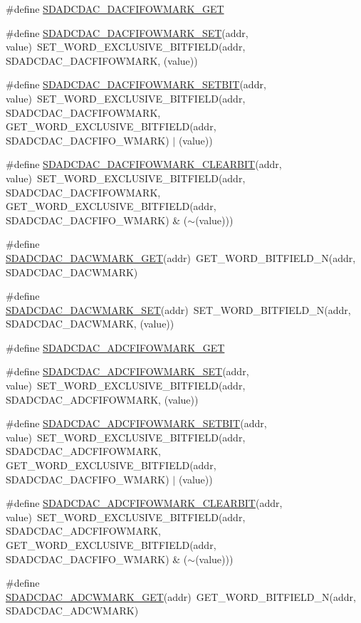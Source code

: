 \begin{DoxyCompactItemize}
\item 
\#define \hyperlink{a00568_a05842ec341ab68cd36ea521476d2c67e}{SDADCDAC\_\-DACFIFOWMARK\_\-GET}
\item 
\#define \hyperlink{a00568_a7d644ce92dcc20a0dbc3794cfcd77732}{SDADCDAC\_\-DACFIFOWMARK\_\-SET}(addr, value)~SET\_\-WORD\_\-EXCLUSIVE\_\-BITFIELD(addr, SDADCDAC\_\-DACFIFOWMARK, (value))
\item 
\#define \hyperlink{a00568_ae2996fa177b28061d754bc7eccc325c4}{SDADCDAC\_\-DACFIFOWMARK\_\-SETBIT}(addr, value)~SET\_\-WORD\_\-EXCLUSIVE\_\-BITFIELD(addr, SDADCDAC\_\-DACFIFOWMARK, GET\_\-WORD\_\-EXCLUSIVE\_\-BITFIELD(addr, SDADCDAC\_\-DACFIFO\_\-WMARK) $|$ (value))
\item 
\#define \hyperlink{a00568_a69498d66319b98963e6dfce384849726}{SDADCDAC\_\-DACFIFOWMARK\_\-CLEARBIT}(addr, value)~SET\_\-WORD\_\-EXCLUSIVE\_\-BITFIELD(addr, SDADCDAC\_\-DACFIFOWMARK, GET\_\-WORD\_\-EXCLUSIVE\_\-BITFIELD(addr, SDADCDAC\_\-DACFIFO\_\-WMARK) \& ($\sim$(value)))
\item 
\#define \hyperlink{a00568_aef4e190953d6a9e95d94c4394251b319}{SDADCDAC\_\-DACWMARK\_\-GET}(addr)~GET\_\-WORD\_\-BITFIELD\_\-N(addr, SDADCDAC\_\-DACWMARK)
\item 
\#define \hyperlink{a00568_ac5770464853118ccc9839b2ec6ccb513}{SDADCDAC\_\-DACWMARK\_\-SET}(addr)~SET\_\-WORD\_\-BITFIELD\_\-N(addr, SDADCDAC\_\-DACWMARK, (value))
\item 
\#define \hyperlink{a00568_a612770f95830818381a7bd03db27e435}{SDADCDAC\_\-ADCFIFOWMARK\_\-GET}
\item 
\#define \hyperlink{a00568_a6c031ddf1193a4e48b892e2332f759c2}{SDADCDAC\_\-ADCFIFOWMARK\_\-SET}(addr, value)~SET\_\-WORD\_\-EXCLUSIVE\_\-BITFIELD(addr, SDADCDAC\_\-ADCFIFOWMARK, (value))
\item 
\#define \hyperlink{a00568_aaef0b0cb0a49365e1b8459b867a2f10c}{SDADCDAC\_\-ADCFIFOWMARK\_\-SETBIT}(addr, value)~SET\_\-WORD\_\-EXCLUSIVE\_\-BITFIELD(addr, SDADCDAC\_\-ADCFIFOWMARK, GET\_\-WORD\_\-EXCLUSIVE\_\-BITFIELD(addr, SDADCDAC\_\-DACFIFO\_\-WMARK) $|$ (value))
\item 
\#define \hyperlink{a00568_a0e2b972524a4319c5de26d2bf66bd371}{SDADCDAC\_\-ADCFIFOWMARK\_\-CLEARBIT}(addr, value)~SET\_\-WORD\_\-EXCLUSIVE\_\-BITFIELD(addr, SDADCDAC\_\-ADCFIFOWMARK, GET\_\-WORD\_\-EXCLUSIVE\_\-BITFIELD(addr, SDADCDAC\_\-DACFIFO\_\-WMARK) \& ($\sim$(value)))
\item 
\#define \hyperlink{a00568_a93a1d4cbf8f63ea501e827c098355ec3}{SDADCDAC\_\-ADCWMARK\_\-GET}(addr)~GET\_\-WORD\_\-BITFIELD\_\-N(addr, SDADCDAC\_\-ADCWMARK)

\end{DoxyCompactItemize}
